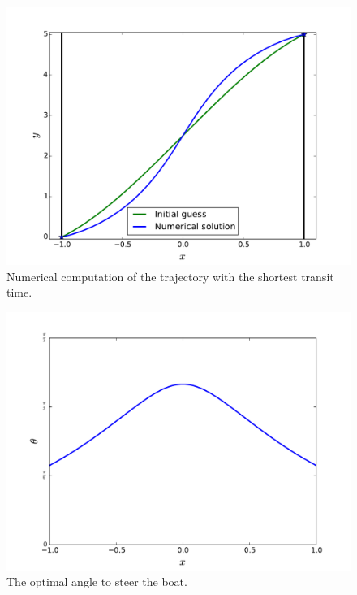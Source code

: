 \begin{figure}
\centering
\includegraphics[width=\textwidth]{minimum_time_rivercrossing.pdf}
\caption{Numerical computation of the trajectory with the shortest transit time.}
\label{fig:rivercrossing_trajectory}
\end{figure}



\begin{figure}
\centering
\includegraphics[width=\textwidth]{trajectory_angle.pdf}
\caption{The optimal angle to steer the boat.}
\label{fig:rivercrossing_angle}
\end{figure}






